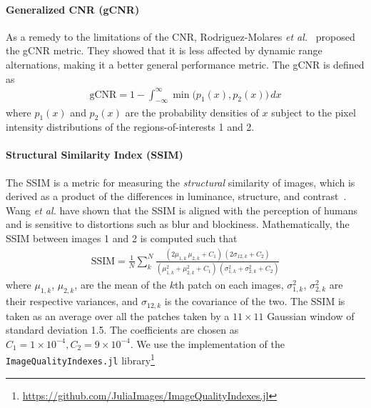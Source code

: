 \paragraph{Generalized CNR (gCNR)}
As a remedy to the limitations of the CNR, Rodriguez-Molares \textit{et al.}~\cite{rodriguez-molares_generalized_2020} proposed the gCNR metric.
They showed that it is less affected by dynamic range alternations, making it a better general performance metric.
The gCNR is defined as
{
\begin{align}
  \text{gCNR} = 1 - \int_{-\infty}^{\infty} \min\big(p_1\left(x\right), p_2\left(x\right)\big) \, dx
\end{align}
}
{\noindent}where \(p_1\left(x\right)\) and \(p_2\left(x\right)\) are the probability densities of \(x\) subject to the pixel intensity distributions of the regions-of-interests 1 and 2.

\paragraph{Structural Similarity Index (SSIM)}
The SSIM is a metric for measuring the \textit{structural} similarity of images, which is derived as a product of the differences in luminance, structure, and contrast~\cite{wang_image_2004a}.
Wang \textit{et al.} have shown that the SSIM is aligned with the perception of humans and is sensitive to distortions such as blur and blockiness.
Mathematically, the SSIM between images 1 and 2 is computed such that
{
\begin{align}
  \mathrm{SSIM} = \frac{1}{N} \sum_k^N \frac{
    (2 \mu_{1,k} \, \mu_{2, k} + C_1)\,(2 \sigma_{12, k} + C_2)
  }{
    (\mu_{1,k}^2 + \mu_{2,k}^2 + C_1)\,( \sigma_{1,k}^2 + \sigma_{2,k}^2 + C_2)
  }
\end{align}
}
{\noindent}where \(\mu_{1,k}\), \(\mu_{2,k}\), are the mean of the \(k\)th patch on each images, \(\sigma_{1,k}^2\), \(\sigma_{2,k}^2\) are their respective variances, and \(\sigma_{12, k}\) is the covariance of the two.
The SSIM is taken as an average over all the patches taken by a \(11 \times 11\) Gaussian window of standard deviation 1.5.
The coefficients are chosen as \(C_1 = 1 \times 10^{-4}, C_2 = 9 \times 10^{-4} \).
We use the implementation of the \texttt{ImageQualityIndexes.jl} library\footnote{\url{https://github.com/JuliaImages/ImageQualityIndexes.jl}}


%
